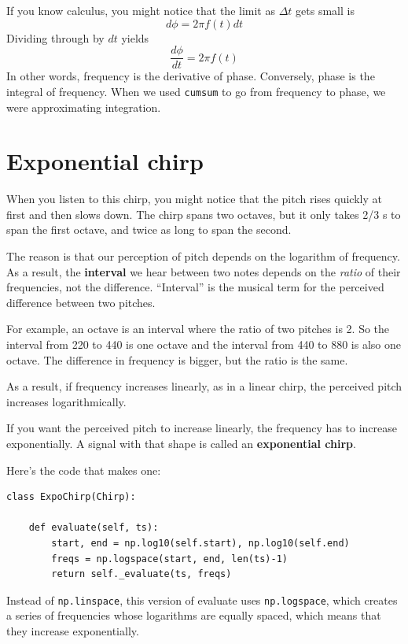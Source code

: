 \documentclass[12pt]{book}
\begin{document}
If you know calculus, you might notice that the limit as
$\Delta t$ gets small is
%
\[ d\phi = 2 \pi f(t) dt \]
%
Dividing through by $dt$ yields
%
\[ \frac{d\phi}{dt} = 2 \pi f(t) \]
%
In other words, frequency is the derivative of phase.  Conversely,
phase is the integral of frequency.  When we used {\tt cumsum}
to go from frequency to phase, we were approximating integration.


\section{Exponential chirp}

When you listen to this chirp, you might notice that the pitch
rises quickly at first and then slows down.
The chirp spans two octaves, but it only takes 2/3 s to span
the first octave, and twice as long to span the second.

The reason is that our perception of pitch depends on the logarithm of
frequency.  As a result, the {\bf interval} we hear between two notes
depends on the {\em ratio} of their frequencies, not the difference.
``Interval'' is the musical term for the perceived difference between
two pitches.

For example, an octave is an interval where the ratio of two
pitches is 2.  So the interval from 220 to 440 is one octave
and the interval from 440 to 880 is also one octave.  The difference
in frequency is bigger, but the ratio is the same.

As a result, if frequency increases linearly, as in a linear
chirp, the perceived pitch increases logarithmically.

If you want the perceived pitch to increase linearly, the frequency
has to increase exponentially.  A signal with that shape is called
an {\bf exponential chirp}.

Here's the code that makes one:

\begin{verbatim}
class ExpoChirp(Chirp):

    def evaluate(self, ts):
        start, end = np.log10(self.start), np.log10(self.end)
        freqs = np.logspace(start, end, len(ts)-1)
        return self._evaluate(ts, freqs)
\end{verbatim}

Instead of {\tt np.linspace}, this version of evaluate uses
{\tt np.logspace}, which creates a series of frequencies
whose logarithms are equally spaced, which means that they increase
exponentially.
\end{document}
